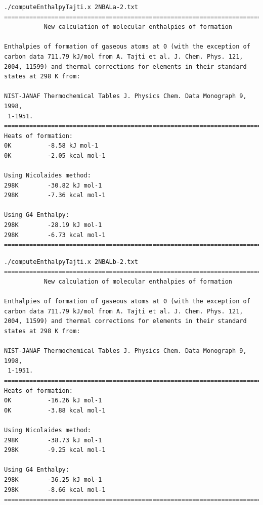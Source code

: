 \begin{lstlisting}[caption = Output de 2NBALa-2.txt en EnthalpyTajti]
./computeEnthalpyTajti.x 2NBALa-2.txt
========================================================================
           New calculation of molecular enthalpies of formation                         
                                                                                                   
Enthalpies of formation of gaseous atoms at 0 (with the exception of 
carbon data 711.79 kJ/mol from A. Tajti et al. J. Chem. Phys. 121, 
2004, 11599) and thermal corrections for elements in their standard 
states at 298 K from:                   
                                                                                                   
NIST-JANAF Thermochemical Tables J. Physics Chem. Data Monograph 9, 1998,
 1-1951.
========================================================================
Heats of formation:
0K          -8.58 kJ mol-1
0K          -2.05 kcal mol-1

Using Nicolaides method:
298K        -30.82 kJ mol-1
298K        -7.36 kcal mol-1

Using G4 Enthalpy:
298K        -28.19 kJ mol-1
298K        -6.73 kcal mol-1
========================================================================
\end{lstlisting}

\newpage

\begin{lstlisting}[caption = Output de 2NBALb-2.txt en EnthalpyTajti]
./computeEnthalpyTajti.x 2NBALb-2.txt
========================================================================
           New calculation of molecular enthalpies of formation                         
                                                                                                   
Enthalpies of formation of gaseous atoms at 0 (with the exception of 
carbon data 711.79 kJ/mol from A. Tajti et al. J. Chem. Phys. 121, 
2004, 11599) and thermal corrections for elements in their standard 
states at 298 K from:                   
                                                                                                   
NIST-JANAF Thermochemical Tables J. Physics Chem. Data Monograph 9, 1998,
 1-1951.
========================================================================
Heats of formation:
0K          -16.26 kJ mol-1
0K          -3.88 kcal mol-1

Using Nicolaides method:
298K        -38.73 kJ mol-1
298K        -9.25 kcal mol-1

Using G4 Enthalpy:
298K        -36.25 kJ mol-1
298K        -8.66 kcal mol-1
========================================================================
\end{lstlisting}

